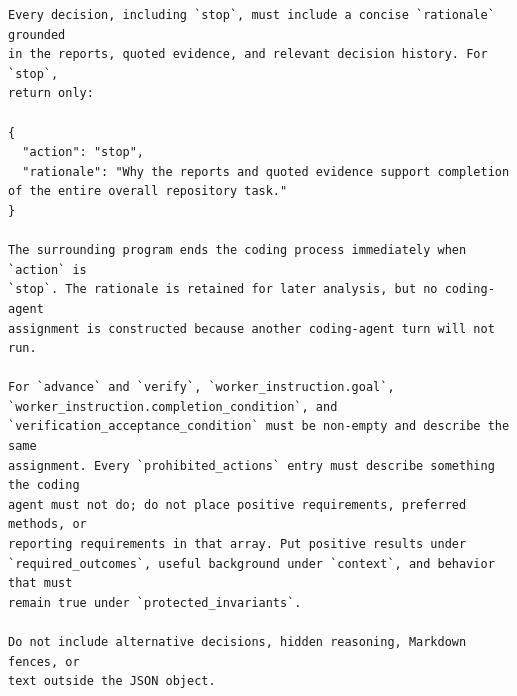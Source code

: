 \begin{lstlisting}[style=looparenaprompt]
Every decision, including `stop`, must include a concise `rationale` grounded
in the reports, quoted evidence, and relevant decision history. For `stop`,
return only:

{
  "action": "stop",
  "rationale": "Why the reports and quoted evidence support completion of the entire overall repository task."
}

The surrounding program ends the coding process immediately when `action` is
`stop`. The rationale is retained for later analysis, but no coding-agent
assignment is constructed because another coding-agent turn will not run.

For `advance` and `verify`, `worker_instruction.goal`,
`worker_instruction.completion_condition`, and
`verification_acceptance_condition` must be non-empty and describe the same
assignment. Every `prohibited_actions` entry must describe something the coding
agent must not do; do not place positive requirements, preferred methods, or
reporting requirements in that array. Put positive results under
`required_outcomes`, useful background under `context`, and behavior that must
remain true under `protected_invariants`.

Do not include alternative decisions, hidden reasoning, Markdown fences, or
text outside the JSON object.
\end{lstlisting}

